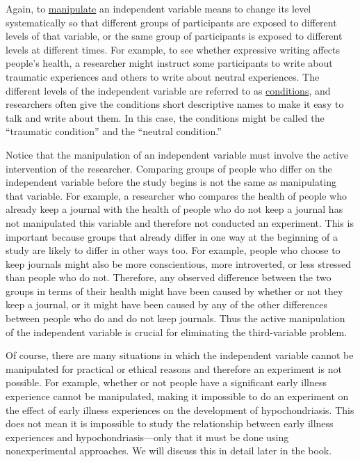 \documentclass[
]{krantz}
\begin{document}
Again, to \hyperref[manipulate]{manipulate} an independent variable means to change its level systematically so that different groups of participants are exposed to different levels of that variable, or the same group of participants is exposed to different levels at different times. For example, to see whether expressive writing affects people's health, a researcher might instruct some participants to write about traumatic experiences and others to write about neutral experiences. The different levels of the independent variable are referred to as \hyperref[condition]{conditions}, and researchers often give the conditions short descriptive names to make it easy to talk and write about them. In this case, the conditions might be called the ``traumatic condition'' and the ``neutral condition.''

Notice that the manipulation of an independent variable must involve the active intervention of the researcher. Comparing groups of people who differ on the independent variable before the study begins is not the same as manipulating that variable. For example, a researcher who compares the health of people who already keep a journal with the health of people who do not keep a journal has not manipulated this variable and therefore not conducted an experiment. This is important because groups that already differ in one way at the beginning of a study are likely to differ in other ways too. For example, people who choose to keep journals might also be more conscientious, more introverted, or less stressed than people who do not. Therefore, any observed difference between the two groups in terms of their health might have been caused by whether or not they keep a journal, or it might have been caused by any of the other differences between people who do and do not keep journals. Thus the active manipulation of the independent variable is crucial for eliminating the third-variable problem.

Of course, there are many situations in which the independent variable cannot be manipulated for practical or ethical reasons and therefore an experiment is not possible. For example, whether or not people have a significant early illness experience cannot be manipulated, making it impossible to do an experiment on the effect of early illness experiences on the development of hypochondriasis. This does not mean it is impossible to study the relationship between early illness experiences and hypochondriasis---only that it must be done using nonexperimental approaches. We will discuss this in detail later in the book.
\end{document}
